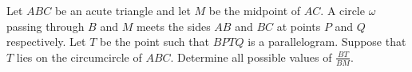 Let 
$ABC$
 be an acute triangle and let 
$M$
 be the midpoint of 
$AC$.
 A circle 
$\omega$
 passing through 
$B$
 and 
$M$
 meets the sides 
$AB$
 and 
$BC$
 at points 
$P$
 and 
$Q$
 respectively. Let 
$T$
 be the point such that 
$BPTQ$
 is a parallelogram. Suppose that 
$T$
 lies on the circumcircle of 
$ABC$.
 Determine all possible values of 
$\frac{BT}{BM}$.
